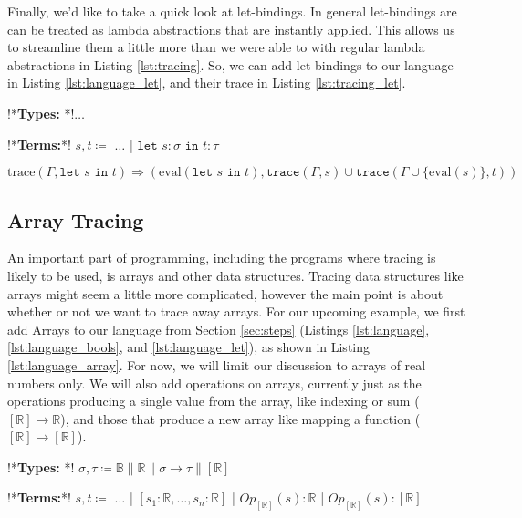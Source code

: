         Finally, we'd like to take a quick look at let-bindings.
        In general let-bindings are can be treated as lambda abstractions that are instantly applied.
        This allows us to streamline them a little more than we were able to with regular lambda abstractions in Listing \ref{lst:tracing}.
        So, we can add let-bindings to our language in Listing \ref{lst:language_let}, and their trace in Listing \ref{lst:tracing_let}.

        \begin{quicklst}[caption=Adding let bindings, label=lst:language_let, gobble=12]
            !*\textbf{Types: }*!$\dots$

            !*\textbf{Terms:}*!
                $s,t\coloneqq$
                    $\dots$
                  | $\texttt{let }s:\sigma\texttt{ in }t:\tau$
        \end{quicklst}

        \begin{quicklst}[caption=Tracing let bindings, label=lst:tracing_let, gobble=12]
            $\text{trace}(\Gamma,\texttt{let }s\texttt{ in }t)\Rightarrow(\text{eval}(\texttt{let }s\texttt{ in }t),\texttt{trace}(\Gamma,s)\cup\texttt{trace}(\Gamma\cup\{\text{eval}(s)\},t))$
        \end{quicklst}

    \subsection{Array Tracing} \label{sec:arrays}
        An important part of programming, including the programs where tracing is likely to be used, is arrays and other data structures.
        Tracing data structures like arrays might seem a little more complicated, however the main point is about whether or not we want to trace away arrays.
        For our upcoming example, we first add Arrays to our language from Section \ref{sec:steps} (Listings \ref{lst:language}, \ref{lst:language_bools}, and \ref{lst:language_let}), as shown in Listing \ref{lst:language_array}.
        For now, we will limit our discussion to arrays of real numbers only.
        We will also add operations on arrays, currently just as the operations producing a single value from the array, like indexing or sum ($[\mathbb{R}]\to\mathbb{R}$), and those that produce a new array like mapping a function ($[\mathbb{R}]\to[\mathbb{R}]$).

        \begin{quicklst}[caption=Adding arrays, label=lst:language_array, gobble=12]
            !*\textbf{Types: }*!
                $\sigma,\tau\coloneqq\mathbb{B}\|\mathbb{R}\|\sigma\to\tau\|[\mathbb{R}]$

            !*\textbf{Terms:}*!
                $s,t\coloneqq$
                    $\dots$
                  | $[s_1:\mathbb{R},\dots,s_n:\mathbb{R}]$
                  | $Op_{[\mathbb{R}]}(s):\mathbb{R}$
                  | $Op_{[\mathbb{R}]}(s):[\mathbb{R}]$
        \end{quicklst}
        
